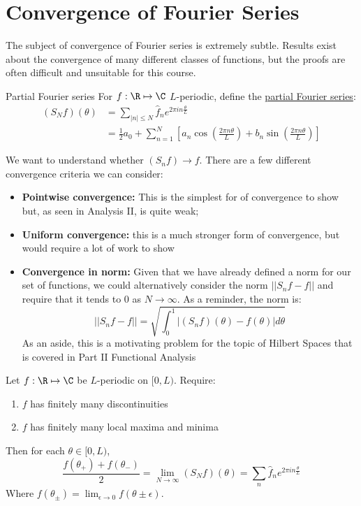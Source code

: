 \documentclass[../Main.tex]{subfiles}
\begin{document}
\section{Convergence of Fourier Series}
The subject of convergence of Fourier series is extremely subtle. Results exist about the convergence of many different classes of functions, but the proofs are often difficult and unsuitable for this course.

\begin{definition}{Partial Fourier series}
    For $f : \R \mapsto \C$ $L$-periodic, define the \underline{partial Fourier series}:
    \begin{align*}
        (S_Nf)(\theta)&=\sum_{|n| \leq N} \hat{f}_n e^{2\pi i n \frac\theta{L}} \\
        &= \frac12 a_0 + \sum_{n = 1}^N \left[a_n \cos\left(\frac{2\pi n \theta}{L}\right) + b_n \sin\left(\frac{2 \pi n \theta}{L}\right)\right]
    \end{align*}
\end{definition}
We want to understand whether $(S_n f) \to f$. There are a few different convergence criteria we can consider:
\begin{itemize}
    \item \textbf{Pointwise convergence:} This is the simplest for of convergence to show but, as seen in Analysis II, is quite weak;
    \item \textbf{Uniform convergence:} this is a much stronger form of convergence, but would require a lot of work to show
    \item \textbf{Convergence in norm:} Given that we have already defined a norm for our set of functions, we could alternatively consider the norm $||S_n f - f||$ and require that it tends to $0$ as $N \to \infty$. As a reminder, the norm is:
        \begin{equation*}
            ||S_n f - f|| = \sqrt{\int_0^1 |(S_n f)(\theta) - f(\theta)|d\theta}
        \end{equation*}
        As an aside, this is a motivating problem for the topic of Hilbert Spaces that is covered in Part II Functional Analysis
\end{itemize}
\begin{theorem}
    Let $f : \R \mapsto \C$ be $L$-periodic on $[0, L)$. Require:
    \begin{enumerate}
        \item $f$ has finitely many discontinuities
        \item $f$ has finitely many local maxima and minima
    \end{enumerate}
    Then for each $\theta \in [0, L)$,
    \begin{equation}
        \frac{f(\theta_+) + f(\theta_-)}{2} = \lim_{N \to \infty} (S_N f)(\theta) = \sum_n \hat{f}_n e^{2\pi i n \frac{\theta}{L}}
        \label{eqnFourierPointwise}
    \end{equation}
    Where $f(\theta_\pm) = \lim_{\epsilon \to 0} f(\theta \pm \epsilon)$.
    \label{thmFourierPointwise}
\end{theorem}
\end{document}

